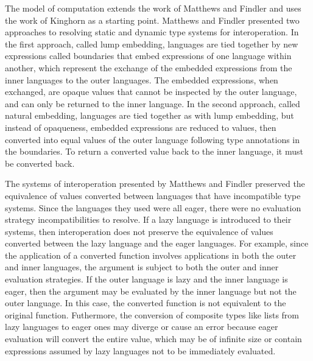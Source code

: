 \begin{figure}[htb]
\onehalfspacing
\centering
\begin{tabular}{c}

\end{tabular}
\caption{}
\label{fig}
\end{figure}

The model of computation extends the work of Matthews and Findler \cite{matthews07} and uses the work of Kinghorn \cite{kinghorn07} as a starting point. Matthews and Findler presented \cite{matthews07} two approaches to resolving static and dynamic type systems for interoperation. In the first approach, called lump embedding, languages are tied together by new expressions called boundaries that embed expressions of one language within another, which represent the exchange of the embedded expressions from the inner languages to the outer languages. The embedded expressions, when exchanged, are opaque values that cannot be inspected by the outer language, and can only be returned to the inner language. In the second approach, called natural embedding, languages are tied together as with lump embedding, but instead of opaqueness, embedded expressions are reduced to values, then converted into equal values of the outer language following type annotations in the boundaries. To return a converted value back to the inner language, it must be converted back.

The systems of interoperation presented by Matthews and Findler \cite{matthews07} preserved the equivalence of values converted between languages that have incompatible type systems. Since the languages they used were all eager, there were no evaluation strategy incompatibilities to resolve. If a lazy language is introduced to their systems, then interoperation does not preserve the equivalence of values converted between the lazy language and the eager languages. For example, since the application of a converted function involves applications in both the outer and inner languages, the argument is subject to both the outer and inner evaluation strategies. If the outer language is lazy and the inner language is eager, then the argument may be evaluated by the inner language but not the outer language. In this case, the converted function is not equivalent to the original function. Futhermore, the conversion of composite types like lists from lazy languages to eager ones may diverge or cause an error because eager evaluation will convert the entire value, which may be of infinite size or contain expressions assumed by lazy languages not to be immediately evaluated.

